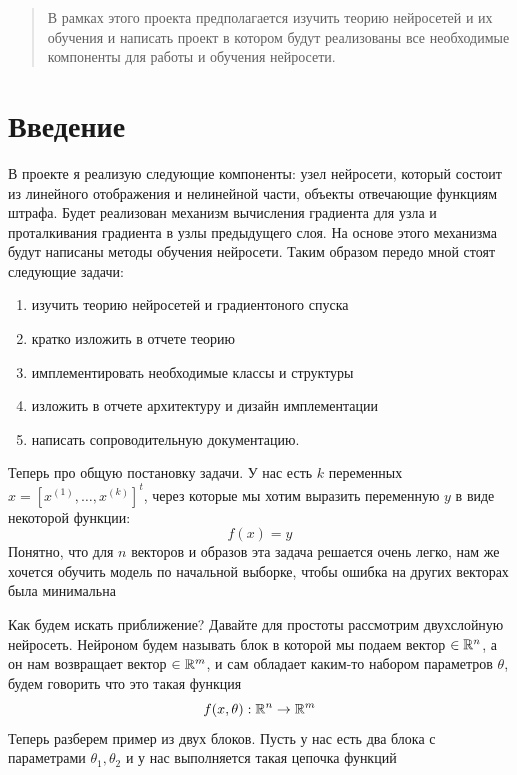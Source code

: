 \documentclass{article}
\begin{document}
\makeTitlePage

\tableofcontents


\newpage

\begin{abstract}
В рамках этого проекта предполагается изучить теорию нейросетей и их обучения и написать проект в котором будут реализованы все необходимые компоненты для работы и обучения нейросети.
\end{abstract}


\section{Введение}

В проекте я реализую следующие компоненты: узел нейросети, который состоит из линейного отображения и нелинейной части, объекты отвечающие функциям штрафа. Будет реализован механизм вычисления градиента для узла и проталкивания градиента в узлы предыдущего слоя. На основе этого механизма будут написаны методы обучения нейросети. Таким образом передо мной стоят следующие задачи:
\begin{enumerate}
    \item изучить теорию нейросетей и градиентоного спуска
    \item кратко изложить в отчете теорию
    \item имплементировать необходимые классы и структуры
    \item изложить в отчете архитектуру и дизайн имплементации
    \item написать сопроводительную документацию.
\end{enumerate}


Теперь про общую постановку задачи. У нас есть $k$ переменных $x = [x^{(1)}, \dots, x^{(k)}]^t$, через которые мы хотим выразить переменную $y$ в виде некоторой функции:
$$
f(x) = y
$$
Понятно, что для $n$ векторов и образов эта задача решается очень легко, нам же хочется обучить модель по начальной выборке, чтобы ошибка на других векторах была минимальна

Как будем искать приближение? Давайте для простоты рассмотрим двухслойную нейросеть. Нейроном будем называть блок в которой мы подаем вектор $\in \mathbb{R}^n$, а он нам возвращает вектор $\in \mathbb{R}^m$, и сам обладает каким-то набором параметров $\theta$, будем говорить что это такая функция
$$
f(x, \theta): \mathbb{R}^n \rightarrow \mathbb{R}^m
$$
Теперь разберем пример из двух блоков. Пусть у нас есть два блока с параметрами $\theta_1, \theta_2$ и у нас выполняется такая цепочка функций
\end{document}
